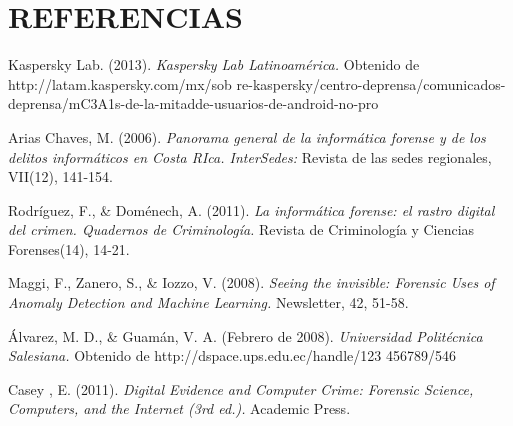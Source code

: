 \documentclass[times,5p, twocolumn]{elsarticle}
\begin{document}
\section{REFERENCIAS}
Kaspersky Lab.  (2013).  \textit{Kaspersky Lab Latinoamérica.} Obtenido de http://latam.kaspersky.com/mx/sob
re-kaspersky/centro-deprensa/comunicados-deprensa/mC3A1s-de-la-mitadde-usuarios-de-android-no-pro

Arias Chaves, M. (2006).  \textit{Panorama
general de la informática forense y
de los delitos informáticos en Costa
RIca. InterSedes:} Revista de las
sedes regionales, VII(12), 141-154.

Rodríguez, F., & Doménech, A. (2011). \textit{ La
informática forense: el rastro digital
del crimen. Quadernos de
Criminología.} Revista de
Criminología y Ciencias
Forenses(14), 14-21.

Maggi, F., Zanero, S., & Iozzo, V. (2008).
\textit{ Seeing the invisible: Forensic Uses
of Anomaly Detection and
Machine Learning.} Newsletter, 42,
51-58.

Álvarez, M. D., & Guamán, V. A. (Febrero
de 2008). \textit{ Universidad Politécnica
Salesiana.} Obtenido de
http://dspace.ups.edu.ec/handle/123
456789/546

Casey , E. (2011). \textit{ Digital Evidence and
Computer Crime: Forensic
Science, Computers, and the
Internet (3rd ed.).} Academic Press.
\end{document}
